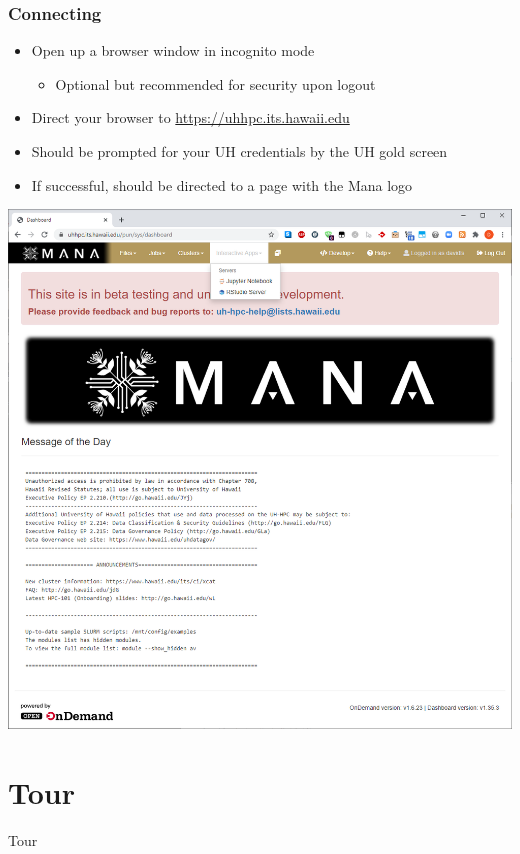 \begin{frame}
\frametitle{Connecting}
			\begin{itemize}
				\item Open up a browser window in incognito mode
					\begin{itemize}
					\item Optional but recommended for security upon logout
					\end{itemize}						
				\item Direct your browser to \url{https://uhhpc.its.hawaii.edu}
				\item Should be prompted for your UH credentials by the UH gold screen
				\item If successful, should be directed to a page with the Mana logo
			\end{itemize}
	\begin{center}
  \includegraphics[scale=0.15]{05.png}
	\end{center}			
\end{frame}

\section[WT]{Tour}
\begin{frame}
\Huge{\centerline{Tour}}
\end{frame}


